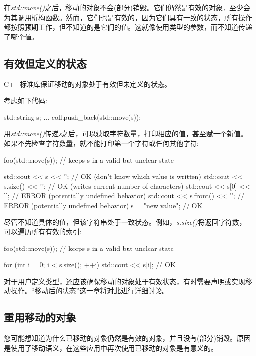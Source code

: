 在\textit{std::move()}之后，移动的对象不会(部分)销毁。它们仍然是有效的对象，至少会为其调用析构函数。然而，它们也是有效的，因为它们具有一致的状态，所有操作都按照预期工作，但不知道的是它们的值。这就像使用类型的参数，而不知道传递了哪个值。

\subsection{有效但定义的状态}

C++标准库保证移动的对象处于有效但未定义的状态。

考虑如下代码:

\begin{cppcode}
std::string s;
...
coll.push_back(std::move(s));
\end{cppcode}

用\textit{std::move()}传递\textit{s}之后，可以获取字符数量，打印相应的值，甚至赋一个新值。如果不先检查字符数量，就不能打印第一个字符或任何其他字符:

\begin{cppcode}
foo(std::move(s)); // keeps s in a valid but unclear state

std::cout << s << '\n'; // OK (don’t know which value is written)
std::cout << s.size() << '\n'; // OK (writes current number of characters)
std::cout << s[0] << '\n'; // ERROR (potentially undefined behavior)
std::cout << s.front() << '\n'; // ERROR (potentially undefined behavior)
s = "new value"; // OK
\end{cppcode}

尽管不知道具体的值，但该字符串处于一致状态。例如，\textit{s.size()}将返回字符数，可以遍历所有有效的索引:

\begin{cppcode}
foo(std::move(s)); // keeps s in a valid but unclear state

for (int i = 0; i < s.size(); ++i) {
	std::cout << s[i]; // OK
}
\end{cppcode}

对于用户定义类型，还应该确保移动的对象处于有效状态，有时需要声明或实现移动操作。“移动后的状态”这一章将对此进行详细讨论。

\subsection{重用移动的对象}

您可能想知道为什么已移动的对象仍然是有效的对象，并且没有(部分)销毁。原因是使用了移动语义，在这些应用中再次使用已移动的对象是有意义的。

